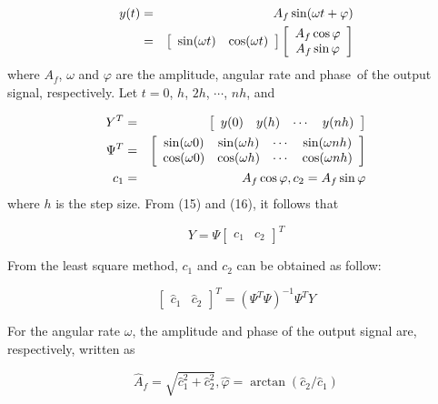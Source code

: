 \documentclass[10pt,journal]{IEEEtran}
\begin{document}
\begin{eqnarray}
y(t) &=&A_{f}\sin (\omega t+\varphi )  \notag \\
&=&\left[
\begin{array}{cc}
\sin (\omega t) & \cos (\omega t)\end{array}\right] \left[
\begin{array}{c}
A_{f}\cos \varphi \\
A_{f}\sin \varphi \end{array}\right]
\end{eqnarray}where $A_{f}$, $\omega $ and $\varphi $ are the amplitude, angular rate and
phase\ of the output signal, respectively. Let $t=0$, $h$, $2h$, $\cdots $, $nh$, and

\begin{eqnarray}
Y^{T} &=&\left[
\begin{array}{cccc}
y(0) & y(h) & \cdots & y(nh)\end{array}\right]  \notag \\
\Psi ^{T} &=&\left[
\begin{array}{cccc}
\sin (\omega 0) & \sin (\omega h) & \cdots & \sin (\omega nh) \\
\cos (\omega 0) & \cos (\omega h) & \cdots & \cos (\omega nh)\end{array}\right]  \notag \\
c_{1} &=&A_{f}\cos \varphi ,c_{2}=A_{f}\sin \varphi
\end{eqnarray}where $h$ is the step size. From (15) and (16), it follows that

\begin{equation}
Y=\Psi \left[
\begin{array}{cc}
c_{1} & c_{2}\end{array}\right] ^{T}
\end{equation}

From the least square method, $c_{1}$ and $c_{2}$ can be obtained as follow:

\begin{equation}
\left[
\begin{array}{cc}
\hat{c}_{1} & \hat{c}_{2}\end{array}\right] ^{T}=(\Psi ^{T}\Psi )^{-1}\Psi ^{T}Y
\end{equation}

For the angular rate $\omega $, the amplitude and phase of the output signal
are, respectively, written as

\begin{equation}
\hat{A}_{f}=\sqrt{\hat{c}_{1}^{2}+\hat{c}_{2}^{2}},\hat{\varphi}=\arctan (\hat{c}_{2}/\hat{c}_{1})
\end{equation}
\end{document}
